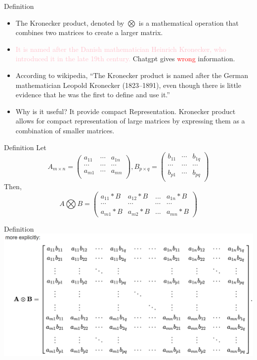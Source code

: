 \documentclass[
  ignorenonframetext,
]{beamer}
\providecommand{\tightlist}{%
  \setlength{\itemsep}{0pt}\setlength{\parskip}{0pt}}
\begin{document}
\begin{frame}{Definition}
\protect\hypertarget{definition}{}
\begin{itemize}
\tightlist
\item
  The Kronecker product, denoted by \(\bigotimes\) is a mathematical
  operation that combines two matrices to create a larger matrix.
\item
  \textcolor{pink}{It is named after the Danish mathematician Heinrich Kronecker, who introduced it in the late 19th century.}
  Chatgpt gives \textcolor{red}{wrong} information.
\item
  According to wikipedia, ``The Kronecker product is named after the
  German mathematician Leopold Kronecker (1823--1891), even though there
  is little evidence that he was the first to define and use it.''
\item
  Why is it useful? It provide compact Representation. Kronecker product
  allows for compact representation of large matrices by expressing them
  as a combination of smaller matrices.
\end{itemize}
\end{frame}

\begin{frame}{Definition}
\protect\hypertarget{definition-1}{}
Let \[A_{m\times n}=\begin{pmatrix}
a_{11} & \cdots & a_{1n}\\
\cdots & \cdots & \cdots\\
a_{m1} & \cdots & a_{mn}\\
\end{pmatrix},
B_{p\times q}=\begin{pmatrix}
b_{11} & \cdots & b_{1q}\\
\cdots & \cdots & \cdots\\
b_{p1} & \cdots & b_{pq}\\
\end{pmatrix}\] Then, \[A \bigotimes B = 
\begin{pmatrix}
a_{11} * B & a_{12} * B & ... & a_{1n} * B \\
\cdots & \cdots & \cdots & \cdots\\
a_{m1} * B & a_{m2} * B & ... & a_{mn} * B 
\end{pmatrix}\]
\end{frame}

\begin{frame}{Definition}
\protect\hypertarget{definition-2}{}
\includegraphics[width=0.8\linewidth]{img/kronecker_prod}
\end{frame}
\end{document}
